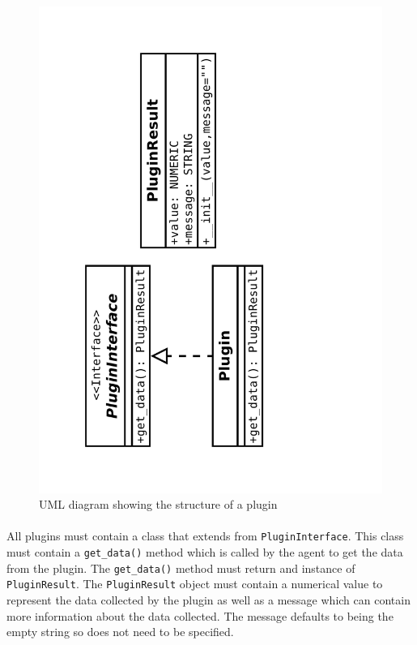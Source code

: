 \documentclass[bsc,logo,twoside,singlespacing,notimes]{infthesis}
\begin{document}
\begin{figure}[H]
	\centering
	\caption{UML diagram showing the structure of a plugin}
	\label{plugin-uml}
	\includegraphics[scale=0.35,angle=-90]{assets/plugin-uml.pdf}
	\vspace{-5em}
\end{figure}

\paragraph*{}
	All plugins must contain a class that extends from \texttt{PluginInterface}.
	This class must contain a \texttt{get\_data()} method which is called by the
	agent to get the data from the plugin.  The \texttt{get\_data()} method must
	return and instance of \texttt{PluginResult}.  The \texttt{PluginResult} object
	must contain a numerical value to represent the data collected by the plugin as
	well as a message which can contain more information about the data collected.
	The message defaults to being the empty string so does not need to be
	specified.
\end{document}

